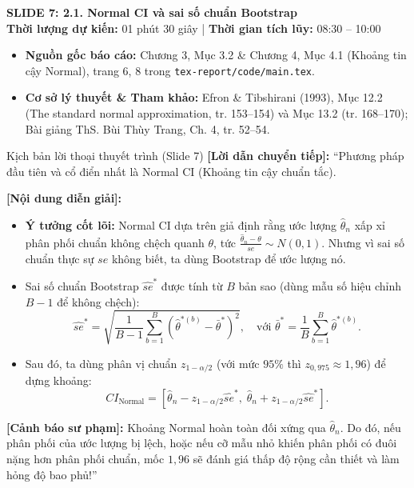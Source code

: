 \documentclass[10pt,a4paper]{article}
\newcommand{\slideheader}[4]{
    \vspace{0.4cm}
    \begin{tcolorbox}[colback=primary!7!white, colframe=primary, arc=2mm, boxrule=1pt, left=4mm, right=4mm, top=2.5mm, bottom=2.5mm]
        {\Large\bfseries\color{primary} SLIDE #1: #2}\\[0.1cm]
        {\small\textbf{Thời lượng dự kiến:} #3 \quad | \quad \textbf{Thời gian tích lũy:} #4}
    \end{tcolorbox}
    \vspace{0.15cm}
}
\begin{document}
\slideheader{7}{2.1. Normal CI và sai số chuẩn Bootstrap}{01 phút 30 giây}{08:30 -- 10:00}

\begin{itemize}
    \item \textbf{Nguồn gốc báo cáo:} Chương 3, Mục 3.2 \& Chương 4, Mục 4.1 (Khoảng tin cậy Normal), trang 6, 8 trong \texttt{tex-report/code/main.tex}.
    \item \textbf{Cơ sở lý thuyết \& Tham khảo:} Efron \& Tibshirani (1993), Mục 12.2 (The standard normal approximation, tr. 153--154) và Mục 13.2 (tr. 168--170); Bài giảng ThS. Bùi Thùy Trang, Ch. 4, tr. 52--54.
\end{itemize}

\begin{scriptbox}{Kịch bản lời thoại thuyết trình (Slide 7)}
    \textbf{[Lời dẫn chuyển tiếp]:} ``Phương pháp đầu tiên và cổ điển nhất là Normal CI (Khoảng tin cậy chuẩn tắc).
    
    \textbf{[Nội dung diễn giải]:} 
    \begin{itemize}
        \item \textbf{Ý tưởng cốt lõi:} Normal CI dựa trên giả định rằng ước lượng $\hat\theta_n$ xấp xỉ phân phối chuẩn không chệch quanh $\theta$, tức $\frac{\hat\theta_n - \theta}{se} \sim N(0,1)$. Nhưng vì sai số chuẩn thực sự $se$ không biết, ta dùng Bootstrap để ước lượng nó.
        \item Sai số chuẩn Bootstrap $\widehat{se}^*$ được tính từ $B$ bản sao (dùng mẫu số hiệu chỉnh $B-1$ để không chệch):
        \[
        \widehat{se}^* = \sqrt{\frac{1}{B-1}\sum_{b=1}^{B}(\hat\theta^{*(b)} - \bar\theta^*)^2}, \quad \text{với } \bar\theta^* = \frac{1}{B}\sum_{b=1}^{B}\hat\theta^{*(b)}.
        \]
        \item Sau đó, ta dùng phân vị chuẩn $z_{1-\alpha/2}$ (với mức $95\%$ thì $z_{0{,}975} \approx 1{,}96$) để dựng khoảng:
        \[
        CI_{\text{Normal}} = \left[\hat\theta_n - z_{1-\alpha/2}\widehat{se}^*,\; \hat\theta_n + z_{1-\alpha/2}\widehat{se}^*\right].
        \]
    \end{itemize}
    \textbf{[Cảnh báo sư phạm]:} Khoảng Normal hoàn toàn đối xứng qua $\hat\theta_n$. Do đó, nếu phân phối của ước lượng bị lệch, hoặc nếu cỡ mẫu nhỏ khiến phân phối có đuôi nặng hơn phân phối chuẩn, mốc $1{,}96$ sẽ đánh giá thấp độ rộng cần thiết và làm hỏng độ bao phủ!''
\end{scriptbox}
\end{document}
